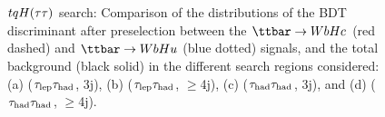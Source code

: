 \begin{figure}[t]
\begin{center}
 \\
 \\
\caption{$tqH(\tau\tau)$ search: Comparison of the distributions of the BDT discriminant after preselection between the $\Hc$ (red dashed) and $\Hu$ (blue dotted) signals, 
and the total background (black solid) in the different search regions considered:
(a) ($\tau_{\mathrm{lep}} \tau_{\mathrm{had}}$, 3j), (b) ($\tau_{\mathrm{lep}} \tau_{\mathrm{had}}$, $\geq$4j), (c) ($\tau_{\mathrm{had}} \tau_{\mathrm{had}}$, 3j), and (d) ($\tau_{\mathrm{had}} \tau_{\mathrm{had}}$, $\geq$4j). }
\label{fig:BDT}
\end{center}
\end{figure}
